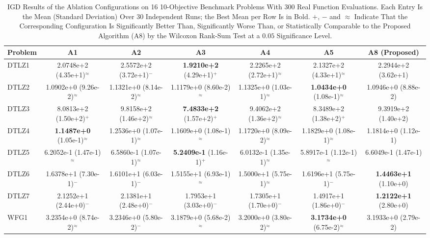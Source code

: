 \begin{table}[!t]
\centering
\caption{IGD Results of the Ablation Configurations on 16 10-Objective
Benchmark Problems With 300 Real Function Evaluations. Each Entry Is the Mean
(Standard Deviation) Over 30 Independent Runs; the Best Mean per Row Is in Bold.
$+$, $-$ and $\approx$ Indicate That the Corresponding Configuration Is
Significantly Better Than, Significantly Worse Than, or Statistically
Comparable to the Proposed Algorithm (A8) by the Wilcoxon Rank-Sum Test at
a $0.05$ Significance Level.}
\label{tab:abl_igd_m10}
\renewcommand{\arraystretch}{1.1}
\setlength{\tabcolsep}{3pt}
\footnotesize
\begin{tabular}{lcccccc}
\toprule
Problem & A1 & A2 & A3 & A4 & A5 & A8 (Proposed) \\
\midrule
DTLZ1 & 2.0748e+2 (4.35e+1)$^{\approx}$ & 2.5572e+2 (3.72e+1)$^{-}$ & \textbf{1.9210e+2} (4.29e+1)$^{+}$ & 2.2265e+2 (2.72e+1)$^{\approx}$ & 2.1327e+2 (4.33e+1)$^{\approx}$ & 2.2944e+2 (3.62e+1) \\
DTLZ2 & 1.0902e+0 (9.26e-2)$^{\approx}$ & 1.1321e+0 (8.14e-2)$^{\approx}$ & 1.1179e+0 (8.60e-2)$^{\approx}$ & 1.1325e+0 (1.03e-1)$^{\approx}$ & \textbf{1.0434e+0} (1.08e-1)$^{\approx}$ & 1.0946e+0 (8.88e-2) \\
DTLZ3 & 8.0813e+2 (1.50e+2)$^{+}$ & 9.8158e+2 (1.46e+2)$^{\approx}$ & \textbf{7.4833e+2} (1.57e+2)$^{+}$ & 9.4062e+2 (1.36e+2)$^{\approx}$ & 8.3489e+2 (1.38e+2)$^{+}$ & 9.3919e+2 (1.40e+2) \\
DTLZ4 & \textbf{1.1487e+0} (1.05e-1)$^{\approx}$ & 1.2536e+0 (1.07e-1)$^{\approx}$ & 1.1609e+0 (1.08e-1)$^{\approx}$ & 1.1720e+0 (8.09e-2)$^{\approx}$ & 1.1829e+0 (1.08e-1)$^{\approx}$ & 1.1814e+0 (1.12e-1) \\
DTLZ5 & 6.2052e-1 (1.47e-1)$^{\approx}$ & 6.5860e-1 (1.07e-1)$^{\approx}$ & \textbf{5.2409e-1} (1.16e-1)$^{+}$ & 6.0132e-1 (1.35e-1)$^{\approx}$ & 5.8917e-1 (1.12e-1)$^{\approx}$ & 6.6049e-1 (1.47e-1) \\
DTLZ6 & 1.6378e+1 (7.30e-1)$^{-}$ & 1.6101e+1 (6.03e-1)$^{-}$ & 1.5155e+1 (6.93e-1)$^{\approx}$ & 1.5000e+1 (5.75e-1)$^{\approx}$ & 1.6196e+1 (5.75e-1)$^{-}$ & \textbf{1.4463e+1} (1.10e+0) \\
DTLZ7 & 2.1252e+1 (2.44e+0)$^{-}$ & 2.1381e+1 (2.48e+0)$^{-}$ & 1.7953e+1 (3.03e+0)$^{-}$ & 1.7305e+1 (1.70e+0)$^{-}$ & 1.4917e+1 (1.86e+0)$^{-}$ & \textbf{1.2122e+1} (2.80e+0) \\
WFG1 & 3.2354e+0 (8.74e-2)$^{\approx}$ & 3.2346e+0 (5.80e-2)$^{-}$ & 3.1879e+0 (5.68e-2)$^{\approx}$ & 3.2000e+0 (3.80e-2)$^{\approx}$ & \textbf{3.1734e+0} (6.75e-2)$^{\approx}$ & 3.1933e+0 (2.79e-2) \\

\end{tabular}
\end{table}
